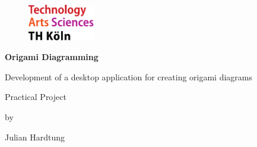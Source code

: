 \begin{titlepage}

\begin{center}

\begin{figure}[!ht]
		\includegraphics[width=0.26\textwidth]{images/THlogoheader.pdf}
\end{figure}

\vspace{0.8cm}

\begin{rmfamily}
\begin{huge}
\textbf{Origami Diagramming}\\	
\end{huge}
\vspace{0.5cm}
\begin{LARGE}
Development of a desktop application for creating origami diagrams\\
\end{LARGE}
\end{rmfamily}

\vspace{1.6cm}



\begin{LARGE}
\begin{scshape}
Practical Project\\[0.8em]
\end{scshape}
\end{LARGE}

\begin{large}
by\\ 
\vspace{0.2cm}
\begin{LARGE}
Julian Hardtung\\
\end{LARGE}
\end{large}


\end{center}
\end{titlepage}
